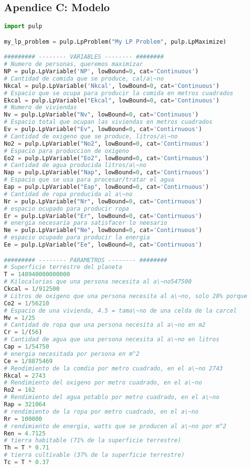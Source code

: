 \documentclass[12pt]{report}
\begin{document}
\subsection*{Apendice C: Modelo}
\begin{lstlisting}[language=Python, frame=single, basicstyle=\tiny]
import pulp

my_lp_problem = pulp.LpProblem("My LP Problem", pulp.LpMaximize)

######### -------- VARIABLES -------- ########
# Numero de personas, queremos maximizar
NP = pulp.LpVariable('NP', lowBound=0, cat='Continuous')
# Cantidad de comida que se produce, cal/a\~no
Nkcal = pulp.LpVariable('Nkcal', lowBound=0, cat='Continuous')
# Espacio que se ocupa para producir la comida en metros cuadrados
Ekcal = pulp.LpVariable("Ekcal", lowBound=0, cat='Continuous')
# Numero de viviendas
Nv = pulp.LpVariable("Nv", lowBound=0, cat='Continuous')
# Espacio total que ocupan las viviendas en metros cuadrados
Ev = pulp.LpVariable("Ev", lowBound=0, cat='Contirnuous')
# Cantidad de oxigeno que se produce, litros/a\~no
No2 = pulp.LpVariable("No2", lowBound=0, cat='Contirnuous')
# Espacio para produccion de oxigeno
Eo2 = pulp.LpVariable("Eo2", lowBound=0, cat='Contirnuous')
# Cantidad de agua producida litros/a\~no
Nap = pulp.LpVariable("Nap", lowBound=0, cat='Contirnuous')
# Espacio que se usa para procesar/tratar el agua
Eap = pulp.LpVariable("Eap", lowBound=0, cat='Contirnuous')
# Cantidad de ropa producida al a\~no
Nr = pulp.LpVariable("Nr", lowBound=0, cat='Contirnuous')
# espacio ocupado para producir ropa
Er = pulp.LpVariable("Er", lowBound=0, cat='Contirnuous')
# energia necesaria para satisfacer lo neesario
Ne = pulp.LpVariable("Ne", lowBound=0, cat='Contirnuous')
# espacio ocupado para producir la energia
Ee = pulp.LpVariable("Ee", lowBound=0, cat='Contirnuous')

######### -------- PARAMETROS -------- ########
# Superficie terrestre del planeta
T = 148940000000000
# Kilocalorias que una persona necesita al a\~no547500
Ckcal = 1/912500
# Litros de oxigeno que una persona necesita al a\~no, solo 28% porque el otro 72 viene de algas marinas
Co2 = 1/56210
# Espacio de una vivienda, 4.5 = tama\~no de una celda de la carcel
Mv = 1/25
# Cantidad de ropa que una persona necesita al a\~no en m2
Cr = 1/(56)
# Cantidad de agua que una persona necesita al a\~no en litros
Cap = 1/54750
# energia necesitada por persona en m^2
Ce = 1/8875469
# Rendimiento de la comdia por metro cuadrado, en el a\~no 2743
Rkcal = 2743
# Rendimiento del oxigeno por metro cuadrado, en el a\~no
Ro2 = 162
# Rendimiento del agua potablo por metro cuadrado, en el a\~no
Rap = 321064
# rendimiento de la ropa por metro cuadrado, en el a\~no
Rr = 100000
# rendimiento de energia, watts que se producen al a\~no por m^2
Ren = 4.7125
# tierra habitable (71% de la superficie terrestre)
Th = T * 0.71
# tierra cultivable (37% de la superficie terrestre)
Tc = T * 0.37


\end{lstlisting}
\end{document}
